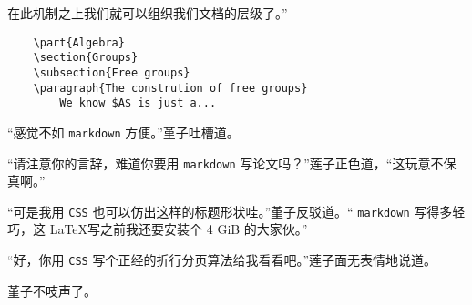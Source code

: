 在此机制之上我们就可以组织我们文档的层级了。”


\begin{lstlisting}
    \part{Algebra}
    \section{Groups}
    \subsection{Free groups}
    \paragraph{The constrution of free groups}
        We know $A$ is just a...
\end{lstlisting}






“感觉不如 \verb"markdown"%
方便。”堇子吐槽道。

“请注意你的言辞，难道你要用 \verb"markdown" 写论文吗？”莲子正色道，“这玩意不保真啊。”

“可是我用 \verb"CSS" 也可以仿出这样的标题形状哇。”堇子反驳道。“ \verb"markdown"%
写得多轻巧，这 \LaTeX 写之前我还要安装个 4 GiB 的大家伙。”

“好，你用 \verb"CSS" 写个正经的折行分页算法给我看看吧。”莲子面无表情地说道。

堇子不吱声了。



